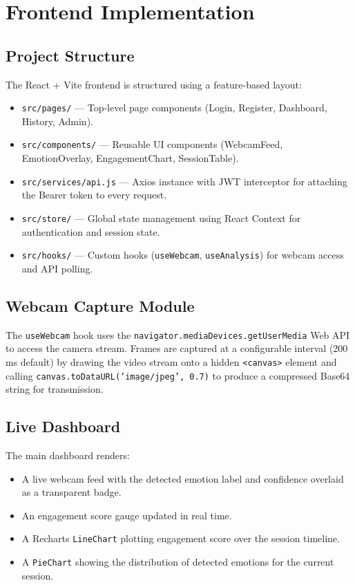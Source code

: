 \section{Frontend Implementation}

\subsection{Project Structure}

The React + Vite frontend is structured using a feature-based layout:

\begin{itemize}
    \item \texttt{src/pages/} — Top-level page components (Login, Register,
          Dashboard, History, Admin).
    \item \texttt{src/components/} — Reusable UI components (WebcamFeed,
          EmotionOverlay, EngagementChart, SessionTable).
    \item \texttt{src/services/api.js} — Axios instance with JWT
          interceptor for attaching the Bearer token to every request.
    \item \texttt{src/store/} — Global state management using React Context
          for authentication and session state.
    \item \texttt{src/hooks/} — Custom hooks (\texttt{useWebcam},
          \texttt{useAnalysis}) for webcam access and API polling.
\end{itemize}

\subsection{Webcam Capture Module}

The \texttt{useWebcam} hook uses the \texttt{navigator.mediaDevices.getUserMedia}
Web API to access the camera stream. Frames are captured at a configurable
interval (200 ms default) by drawing the video stream onto a hidden
\texttt{<canvas>} element and calling \texttt{canvas.toDataURL('image/jpeg', 0.7)}
to produce a compressed Base64 string for transmission.

\subsection{Live Dashboard}

The main dashboard renders:
\begin{itemize}
    \item A live webcam feed with the detected emotion label and confidence
          overlaid as a transparent badge.
    \item An engagement score gauge updated in real time.
    \item A Recharts \texttt{LineChart} plotting engagement score over the
          session timeline.
    \item A \texttt{PieChart} showing the distribution of detected emotions
          for the current session.
\end{itemize}

